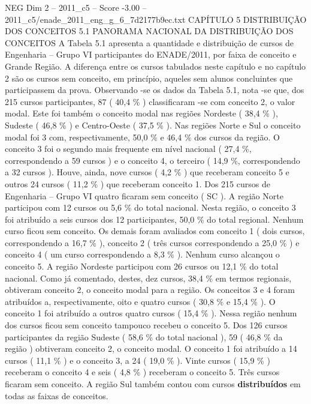 \begin{textsample}{NEG Dim 2 – 2011\_c5 – Score -3.00 – 2011\_c5/enade\_2011\_eng\_g\_6\_7d2177b9ec.txt}  \label{ex:f2_neg_085}
CAPÍTULO 5 DISTRIBUIÇÃO DOS CONCEITOS 5.1 PANORAMA NACIONAL DA DISTRIBUIÇÃO DOS CONCEITOS A Tabela 5.1 apresenta a quantidade e distribuição de cursos de Engenharia – Grupo VI participantes do ENADE/2011, por faixa de conceito e Grande Região.
A diferença entre os cursos tabulados neste capítulo e no capítulo 2 são os cursos sem conceito, em princípio, aqueles sem alunos concluintes que participassem da prova.
Observando -se os dados da Tabela 5.1, nota -se que, dos 215 cursos participantes, 87 ( 40,4 \% ) classificaram -se com conceito 2, o valor modal.
Este foi também o conceito modal nas regiões Nordeste ( 38,4 \% ), Sudeste ( 46,8 \% ) e Centro-Oeste ( 37,5 \% ).
Nas regiões Norte e Sul o conceito modal foi 3 com, respectivamente, 50,0 \% e 46,4 \% dos cursos da região.
O conceito 3 foi o segundo mais frequente em nível nacional ( 27,4 \%, correspondendo a 59 cursos ) e o conceito 4, o terceiro ( 14,9 \%, correspondendo a 32 cursos ).
Houve, ainda, nove cursos ( 4,2 \% ) que receberam conceito 5 e outros 24 cursos ( 11,2 \% ) que receberam conceito 1.
Dos 215 cursos de Engenharia – Grupo VI quatro ficaram sem conceito ( SC ).
A região Norte participou com 12 cursos ou 5,6 \% do total nacional.
Nesta região, o conceito 3 foi atribuído a seis cursos dos 12 participantes, 50,0 \% do total regional.
Nenhum curso ficou sem conceito.
Os demais foram avaliados com conceito 1 ( dois cursos, correspondendo a 16,7 \% ), conceito 2 ( três cursos correspondendo a 25,0 \% ) e conceito 4 ( um curso correspondendo a 8,3 \% ).
Nenhum curso alcançou o conceito 5.
A região Nordeste participou com 26 cursos ou 12,1 \% do total nacional.
Como já comentado, destes, dez cursos, 38,4 \% em termos regionais, obtiveram conceito 2, o conceito modal para a região.
Os conceitos 3 e 4 foram atribuídos a, respectivamente, oito e quatro cursos ( 30,8 \% e 15,4 \% ).
O conceito 1 foi atribuído a outros quatro cursos ( 15,4 \% ).
Nessa região nenhum dos cursos ficou sem conceito tampouco recebeu o conceito 5.
Dos 126 cursos participantes da região Sudeste ( 58,6 \% do total nacional ), 59 ( 46,8 \% da região ) obtiveram conceito 2, o conceito modal.
O conceito 1 foi atribuído a 14 cursos ( 11,1 \% ) e o conceito 3, a 24 ( 19,0 \% ).
Vinte cursos ( 15,9 \% ) receberam o conceito 4 e seis ( 4,8 \% ) receberam o conceito 5.
Três cursos ficaram sem conceito.
A região Sul também contou com cursos \textbf{distribuídos} em todas as faixas de conceitos.

\end{textsample}
